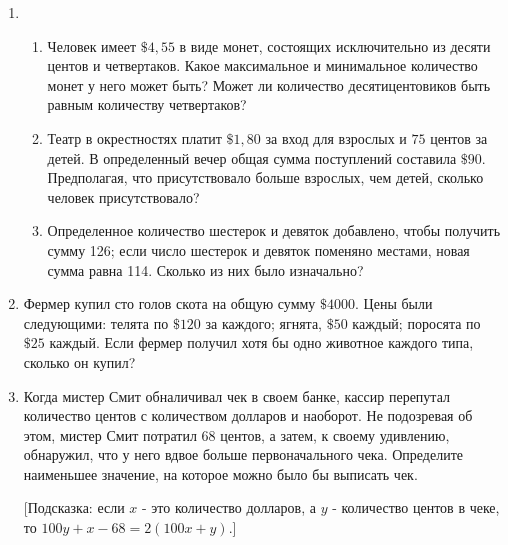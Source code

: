 \documentclass[11pt]{article}
\begin{document}
\begin{enumerate}
\begin{enumerate}
		[Подсказка: используйте $y = 3s - 5t$ и $z = -s + 2r$.]
	\end{enumerate}
	\item
	\begin{enumerate}
		\item Человек имеет $\$4,55$ в виде монет, состоящих исключительно из десяти центов и четвертаков. Какое максимальное и минимальное количество монет у него может быть? Может ли количество десятицентовиков быть равным количеству четвертаков?
		\item Театр в окрестностях платит $\$1,80$ за вход для взрослых и $75$ центов за детей. В определенный вечер общая сумма поступлений составила $\$90$. Предполагая, что присутствовало больше взрослых, чем детей, сколько человек присутствовало?
		\item Определенное количество шестерок и девяток добавлено, чтобы получить сумму 126; если число шестерок и девяток поменяно местами, новая сумма равна 114. Сколько из них было изначально?
	\end{enumerate}
	\item Фермер купил сто голов скота на общую сумму $\$4000$. Цены были следующими: телята по $\$120$ за каждого; ягнята, $\$50$ каждый; поросята по $\$25$ каждый. Если фермер получил хотя бы одно животное каждого типа, сколько он купил?
	\item Когда мистер Смит обналичивал чек в своем банке, кассир перепутал количество центов с количеством долларов и наоборот. Не подозревая об этом, мистер Смит потратил 68 центов, а затем, к своему удивлению, обнаружил, что у него вдвое больше первоначального чека. Определите наименьшее значение, на которое можно было бы выписать чек.
	
	[Подсказка: если $x$ - это количество долларов, а $y$ - количество центов в чеке, то $100y + x - 68 = 2 (100x+y)$.]
\end{enumerate}
\end{document}
